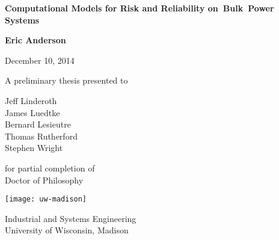 \begin{titlepage}
    \begin{center}
        \vspace*{2cm}
        
{\LARGE        \textbf{Computational Models for Risk and Reliability on~Bulk~Power Systems}}
                
        \vspace{1.5cm}
        
        \textbf{Eric Anderson}

        \vspace{.2cm}

        December 10, 2014

        \vfill
        
        A preliminary thesis presented to

        \vspace{.15cm}

        Jeff Linderoth\\
        James Luedtke\\
        Bernard Lesieutre \\
        Thomas Rutherford\\
        Stephen Wright

        \vspace{.25cm}

        for partial completion of\\
        Doctor of Philosophy\\
        
        \vspace{0.3cm}
        
        \texttt{[image: uw-madison]}
       
        Industrial and Systems Engineering\\        
        University of Wisconsin, Madison\\
        
        \vspace{1cm}

        
    \end{center}
\end{titlepage}
